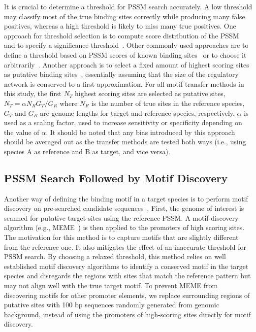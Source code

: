 \documentclass[]{llncs}
\begin{document}
It is crucial to determine a threshold for PSSM search accurately. A low
threshold may classify most of the true binding sites correctly while producing
many false positives, whereas a high threshold is likely to miss many true
positives. One approach for threshold selection is to compute score distribution
of the PSSM and to specify a significance threshold~\cite{beckstette2006fast,
  staden1989methods,rahmann2003power}. Other commonly used approaches are to
define a threshold based on PSSM scores of known binding
sites~\cite{cornish2012inference, kazakov2013transcription} or to choose it
arbitrarily~\cite{kazakov2013transcription}. Another approach is to select a
fixed amount of highest scoring sites as putative binding
sites~\cite{lee2013lasagna}, essentially assuming that the size of the
regulatory network is conserved to a first approximation. For all motif transfer
methods in this study, the first $N_T$ highest scoring sites are selected as
putative sites, $N_T=\alpha{N_R}{G_T}/{G_R}$ where $N_R$ is the number of true
sites in the reference species, $G_T$ and $G_R$ are genome lengths for target
and reference species, respectively. $\alpha$ is used as a scaling factor, used
to increase sensitivity or specificity depending on the value of $\alpha$. It
should be noted that any bias introduced by this approach should be averaged out
as the transfer methods are tested both ways (i.e., using species A as reference
and B as target, and vice versa).

\subsection{PSSM Search Followed by Motif Discovery}
Another way of defining the binding motif in a target species is to perform
motif discovery on pre-searched candidate
sequences~\cite{habib2012functional}. First, the genome of interest is scanned
for putative target sites using the reference PSSM\@. A motif discovery
algorithm (e.g., MEME~\cite{bailey2006meme}) is then applied to the promoters of
high scoring sites. The motivation for this method is to capture motifs that are
slightly different from the reference one. It also mitigates the effect of an
inaccurate threshold for PSSM search. By choosing a relaxed threshold, this
method relies on well established motif discovery algorithms to identify a
conserved motif in the target species and disregards the regions with sites that
match the reference pattern but may not align well with the true target
motif. To prevent MEME from discovering motifs for other promoter elements, we
replace surrounding regions of putative sites with 100 bp sequences randomly
generated from genomic background, instead of using the promoters of
high-scoring sites directly for motif discovery.
\end{document}

